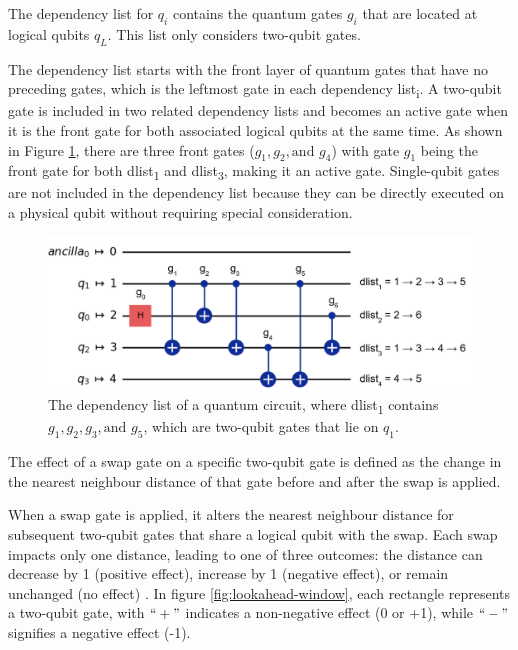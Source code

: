 \begin{definition} %
    The dependency list for $q_i$ contains the quantum gates $g_i$ that are located at logical qubits $q_L$. This list only considers two-qubit gates.
\end{definition}
The dependency list starts with the front layer of quantum gates that have no preceding gates, which is the leftmost gate in each dependency list\textsubscript{i}. A two-qubit gate is included in two related dependency lists and becomes an active gate when it is the front gate for both associated logical qubits at the same time. As shown in Figure \ref{fig:dependency-list}, there are three front gates ($g_1, g_2, \text{and } g_4$) with gate $g_1$ being the front gate for both dlist\textsubscript{1} and dlist\textsubscript{3}, making it an active gate. Single-qubit gates are not included in the dependency list because they can be directly executed on a physical qubit without requiring special consideration.
\begin{figure}[htbp]
    \centering
    \includegraphics[width=0.7\linewidth]{image/dependency_list.png}
    \caption{The dependency list of a quantum circuit, where dlist\textsubscript{1} contains $g_1, g_2, g_3, \text{and } g_5$, which are two-qubit gates that lie on $q_1$.}
    \label{fig:dependency-list}
\end{figure}

\begin{definition} %
    The effect of a swap gate on a specific two-qubit gate is defined as the change in the nearest neighbour distance of that gate before and after the swap is applied.
\end{definition}
When a swap gate is applied, it alters the nearest neighbour distance for subsequent two-qubit gates that share a logical qubit with the swap. Each swap impacts only one distance, leading to one of three outcomes: the distance can decrease by 1 (positive effect), increase by 1 (negative effect), or remain unchanged (no effect) \cite{zhu_dynamic_2020}. In figure \ref{fig:lookahead-window}, each rectangle represents a two-qubit gate, with $``+"$ indicates a non-negative effect (0 or +1), while $``-"$ signifies a negative effect (-1).

